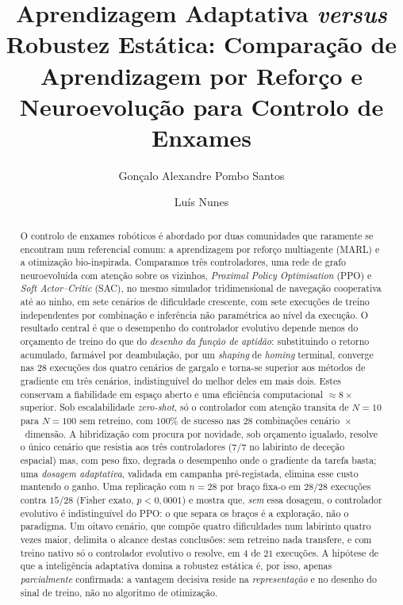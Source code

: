 \documentclass[final,5p,times,twocolumn,authoryear]{elsarticle}
\begin{document}
\begin{frontmatter}

\title{Aprendizagem Adaptativa \emph{versus} Robustez Estática: Comparação de
Aprendizagem por Reforço e Neuroevolução para Controlo de Enxames}

\author[iscte]{Gon\c{c}alo Alexandre Pombo Santos}
\author[iscte]{Lu\'is Nunes}


\begin{abstract}
O controlo de enxames robóticos é abordado por duas comunidades que raramente se
encontram num referencial comum: a aprendizagem por reforço multiagente (MARL) e
a otimização bio-inspirada. Comparamos três controladores, uma rede de grafo
neuroevoluída com atenção sobre os vizinhos, \emph{Proximal Policy Optimisation}
(PPO) e \emph{Soft Actor--Critic} (SAC), no mesmo simulador tridimensional de
navegação cooperativa até ao ninho, em sete cenários de dificuldade crescente, com sete execuções de
treino independentes por combinação e inferência não paramétrica ao nível da
execução. O resultado central é que o desempenho do controlador evolutivo depende
menos do orçamento de treino do que do \emph{desenho da função de aptidão}:
substituindo o retorno acumulado, farmável por deambulação, por um
\emph{shaping} de \emph{homing} terminal, converge nas $28$ execuções dos quatro
cenários de gargalo e torna-se superior aos métodos de gradiente em três
cenários, indistinguível do melhor deles em mais dois. Estes conservam a
fiabilidade em espaço aberto e uma eficiência computacional $\approx 8\times$
superior. Sob escalabilidade \emph{zero-shot}, só o controlador com atenção
transita de $N=10$ para $N=100$ sem retreino, com $100\%$ de sucesso nas $28$
combinações cenário~$\times$~dimensão. A hibridização com procura por novidade,
sob orçamento igualado, resolve o único cenário que resistia aos três
controladores ($7/7$ no labirinto de deceção espacial) mas, com peso fixo,
degrada o desempenho onde o gradiente da tarefa basta; uma \emph{dosagem
adaptativa}, validada em campanha pré-registada, elimina esse custo mantendo o
ganho. Uma replicação com $n=28$ por braço fixa-o em $28/28$ execuções contra
$15/28$ (Fisher exato, $p<0{,}0001$) e mostra que, \emph{sem} essa dosagem, o
controlador evolutivo é indistinguível do PPO: o que separa os braços é a
exploração, não o paradigma. Um oitavo cenário, que compõe quatro dificuldades
num labirinto quatro vezes maior, delimita o alcance destas conclusões: sem
retreino nada transfere, e com treino nativo só o controlador evolutivo o
resolve, em $4$ de $21$ execuções. A hipótese de que a inteligência adaptativa domina a
robustez estática é, por isso, apenas \emph{parcialmente} confirmada: a
vantagem decisiva reside na \emph{representação} e no desenho do sinal de treino,
não no algoritmo de otimização.
\end{abstract}


\end{frontmatter}
\end{document}
